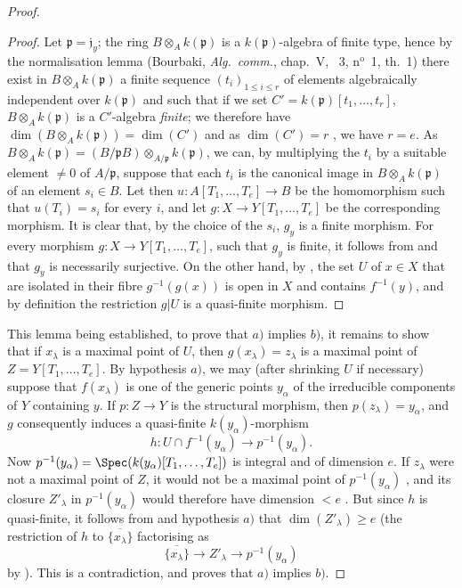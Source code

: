 \begin{proof}
\begin{proof}
Let $\mathfrak{p}=\mathfrak{j}_y$; the ring $B\otimes_A k(\mathfrak{p})$ is a $k(\mathfrak{p})$-algebra of finite type, hence by the normalisation lemma (Bourbaki, \emph{Alg.\ comm.}, chap.~V, \textsection~3, n$^{\text{o}}$~1, th.~1) there exist in $B\otimes_A k(\mathfrak{p})$ a finite sequence $(t_i)_{1\leq i\leq r}$ of elements algebraically independent over $k(\mathfrak{p})$ and such that if we set $C'=k(\mathfrak{p})[t_1,\ldots,t_r]$, $B\otimes_A k(\mathfrak{p})$ is a $C'$-algebra \emph{finite}; we therefore have $\dim(B\otimes_A k(\mathfrak{p}))=\dim(C')$  and as $\dim(C')=r$ , we have $r=e$.
As $B\otimes_A k(\mathfrak{p})=(B/\mathfrak{p}B)\otimes_{A/\mathfrak{p}}k(\mathfrak{p})$, we can, by multiplying the $t_i$ by a suitable element $\neq0$
of $A/\mathfrak{p}$, suppose that each $t_i$ is the canonical image in $B\otimes_A k(\mathfrak{p})$ of an element $s_i\in B$.
Let then $u:A[T_1,\ldots,T_e]\to B$ be the homomorphism such that $u(T_i)=s_i$ for every $i$, and let $g:X\to Y[T_1,\ldots,T_e]$ be the corresponding morphism.
It is clear that, by the choice of the $s_i$, $g_y$ is a finite morphism.
For every morphism $g:X\to Y[T_1,\ldots,T_e]$, such that $g_y$ is finite, it follows from  and  that $g_y$ is necessarily surjective.
On the other hand, by , the set $U$ of $x\in X$ that are isolated in their fibre $g^{-1}(g(x))$ is open in $X$ and contains $f^{-1}(y)$, and by definition the restriction $g|U$ is a quasi-finite morphism.
\end{proof}

This lemma being established, to prove that $a)$ implies $b)$, it remains to show that if $x_\lambda$ is a maximal point of $U$, then $g(x_\lambda)=z_\lambda$ is a maximal point of $Z=Y[T_1,\ldots,T_e]$.
By hypothesis $a)$, we may (after shrinking $U$ if necessary) suppose that $f(x_\lambda)$ is one of the generic points $y_\alpha$ of the irreducible components of $Y$ containing $y$. If $p:Z\to Y$ is the structural morphism, then $p(z_\lambda)=y_\alpha$, and $g$ consequently induces a quasi-finite $k(y_\alpha)$-morphism
\[
h:U\cap f^{-1}(y_\alpha)\longrightarrow p^{-1}(y_\alpha).
\]
Now $p^{-1}(y_\alpha)=\Spec(k(y_\alpha)[T_1,\ldots,T_e])$ is integral and of dimension $e$. If $z_\lambda$ were not a maximal point of $Z$, it would not be a maximal point of $p^{-1}(y_\alpha)$ , and its closure $Z'_\lambda$ in $p^{-1}(y_\alpha)$ would therefore have dimension $<e$ . But since $h$ is quasi-finite, it follows from  and hypothesis $a)$ that $\dim(Z'_\lambda)\geq e$ (the restriction of $h$ to $\overline{\{x_\lambda\}}$ factorising as
\[
\overline{\{x_\lambda\}}\longrightarrow Z'_\lambda\longrightarrow p^{-1}(y_\alpha)
\]
by ). This is a contradiction, and proves that $a)$ implies $b)$.


\end{proof}
